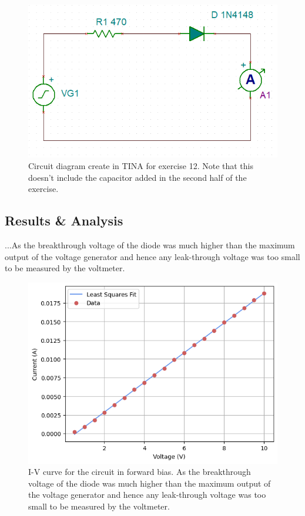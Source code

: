 \documentclass[%
reprint,
amsmath,amssymb,
aps,
floatfix
]{revtex4-2}
\begin{document}
		\begin{figure}
			\includegraphics[width=0.85\columnwidth]{ex12Circuit.png}
			\caption{\label{fig:ex12Circuit}Circuit diagram create in TINA for exercise 12. Note that this doesn't include the capacitor added in the second half of the exercise.}
		\end{figure}
		\subsection{Results \& Analysis}
		
		...As the breakthrough voltage of the diode was much higher than the maximum output of the voltage generator and hence any leak-through voltage was too small to be measured by the voltmeter.
		\begin{figure}
			\includegraphics[width=0.85\columnwidth]{IVCurveLinear.png}
			\caption{\label{fig:IVCurveLinear}I-V curve for the circuit in forward bias. As the breakthrough voltage of the diode was much higher than the maximum output of the voltage generator and hence any leak-through voltage was too small to be measured by the voltmeter.}
		\end{figure}
		
\end{document}
